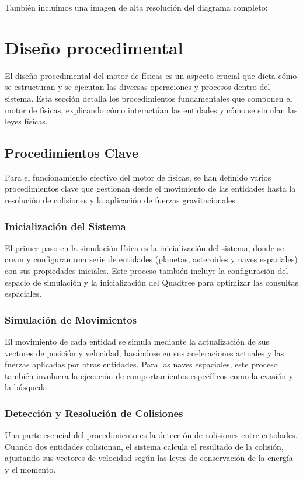 También incluimos una imagen de alta resolución del diagrama completo:

\section{Diseño procedimental}
El diseño procedimental del motor de físicas es un aspecto crucial que dicta cómo se estructuran y se ejecutan las diversas operaciones y procesos dentro del sistema. Esta sección detalla los procedimientos fundamentales que componen el motor de físicas, explicando cómo interactúan las entidades y cómo se simulan las leyes físicas.

\subsection{Procedimientos Clave}
Para el funcionamiento efectivo del motor de físicas, se han definido varios procedimientos clave que gestionan desde el movimiento de las entidades hasta la resolución de colisiones y la aplicación de fuerzas gravitacionales.

\subsubsection{Inicialización del Sistema}
El primer paso en la simulación física es la inicialización del sistema, donde se crean y configuran una serie de entidades (planetas, asteroides y naves espaciales) con sus propiedades iniciales. Este proceso también incluye la configuración del espacio de simulación y la inicialización del Quadtree para optimizar las consultas espaciales.

\subsubsection{Simulación de Movimientos}
El movimiento de cada entidad se simula mediante la actualización de sus vectores de posición y velocidad, basándose en sus aceleraciones actuales y las fuerzas aplicadas por otras entidades. Para las naves espaciales, este proceso también involucra la ejecución de comportamientos específicos como la evasión y la búsqueda.

\subsubsection{Detección y Resolución de Colisiones}
Una parte esencial del procedimiento es la detección de colisiones entre entidades. Cuando dos entidades colisionan, el sistema calcula el resultado de la colisión, ajustando sus vectores de velocidad según las leyes de conservación de la energía y el momento. 

